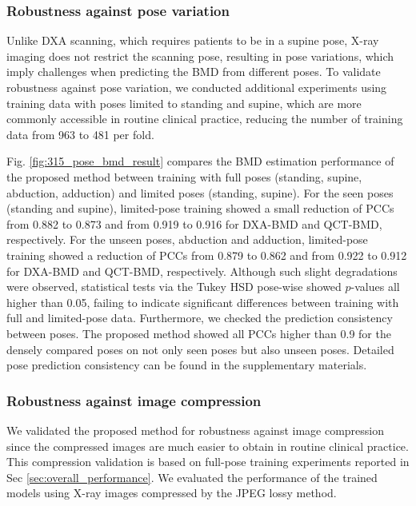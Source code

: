 \documentclass[times,twocolumn,final]{elsarticle}
\begin{document}
\subsubsection{Robustness against pose variation}
\label{sec:exp_pose}
Unlike DXA scanning, which requires patients to be in a supine pose, X-ray imaging does not restrict the scanning pose, resulting in pose variations, which imply challenges when predicting the BMD from different poses.
To validate robustness against pose variation, we conducted additional experiments using training data with poses limited to standing and supine, which are more commonly accessible in routine clinical practice, reducing the number of training data from 963 to 481 per fold.

Fig. \ref{fig:315_pose_bmd_result} compares the BMD estimation performance of the proposed method between training with full poses (standing, supine, abduction, adduction) and limited poses (standing, supine).
For the seen poses (standing and supine), limited-pose training showed a small reduction of PCCs from 0.882 to 0.873 and from 0.919 to 0.916 for DXA-BMD and QCT-BMD, respectively.
For the unseen poses, abduction and adduction, limited-pose training showed a reduction of PCCs from 0.879 to 0.862 and from 0.922 to 0.912 for DXA-BMD and QCT-BMD, respectively.
Although such slight degradations were observed, statistical tests via the Tukey HSD pose-wise showed $p$-values all higher than 0.05, failing to indicate significant differences between training with full and limited-pose data.
Furthermore, we checked the prediction consistency between poses.
The proposed method showed all PCCs higher than 0.9 for the densely compared poses on not only seen poses but also unseen poses.
Detailed pose prediction consistency can be found in the supplementary materials.


\subsubsection{Robustness against image compression}
\label{sec:exp_compression}
We validated the proposed method for robustness against image compression since the compressed images are much easier to obtain in routine clinical practice.
This compression validation is based on full-pose training experiments reported in Sec \ref{sec:overall_performance}.
We evaluated the performance of the trained models using X-ray images compressed by the JPEG lossy method.
\end{document}
